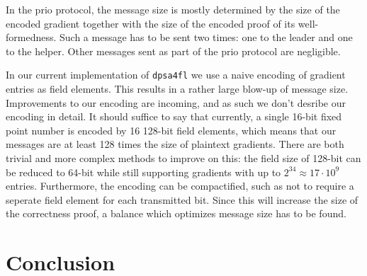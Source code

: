 \documentclass{article}
\begin{document}
In the prio protocol, the message size is mostly determined by the size of the
encoded gradient together with the size of the encoded proof of its
well-formedness. Such a message has to be sent two times: one to the leader and
one to the helper. Other messages sent as part of the prio protocol are negligible.

In our current implementation of \texttt{dpsa4fl} we use a naive encoding of
gradient entries as field elements. This results in a rather large blow-up of
message size. Improvements to our encoding are incoming, and as such we don't
desribe our encoding in detail. It should suffice to say that currently, a
single 16-bit fixed point number is encoded by 16 128-bit field elements, which
means that our messages are at least 128 times the size of plaintext gradients.
There are both trivial and more complex methods to improve on this: the field
size of 128-bit can be reduced to 64-bit while still supporting gradients with
up to $2^{34} \approx 17 \cdot 10^9$ entries. Furthermore, the encoding can be
compactified, such as not to require a seperate field element for each
transmitted bit. Since this will increase the size of the correctness proof,
a balance which optimizes message size has to be found.






\section{Conclusion}



\end{document}
